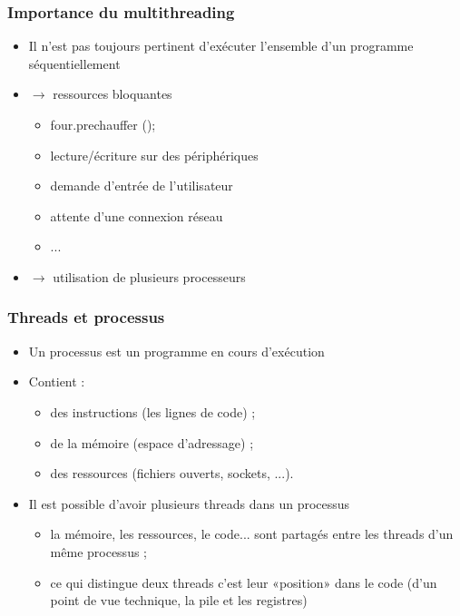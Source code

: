 \documentclass{beamer}
\begin{document}
\begin{frame}
  \frametitle{Importance du multithreading}
  \begin{itemize}
  \item Il n'est pas toujours pertinent d'exécuter l'ensemble d'un
    programme séquentiellement
  \item $\rightarrow$ ressources bloquantes
    \begin{itemize}
    \item four.prechauffer ();
    \item lecture/écriture sur des périphériques
    \item demande d'entrée de l'utilisateur
    \item attente d'une connexion réseau
    \item ...
    \end{itemize}
  \item $\rightarrow$ utilisation de plusieurs processeurs
  \end{itemize}
\end{frame}

\begin{frame}
  \frametitle{Threads et processus}
  \begin{itemize}
  \item Un processus est un programme en cours d'exécution
  \item Contient :
    \begin{itemize}
    \item des instructions (les lignes de code) ;
    \item de la mémoire (espace d'adressage) ;
    \item des ressources (fichiers ouverts, sockets, ...).
    \end{itemize}
  \item Il est possible d'avoir plusieurs threads dans un processus
    \begin{itemize}
    \item la mémoire, les ressources, le code... sont partagés entre
      les threads d'un même processus ;
    \item ce qui distingue deux threads c'est leur «position» dans le
      code (d'un point de vue technique, la pile et les registres)
    \end{itemize}
  \end{itemize}
\end{frame}
\end{document}
